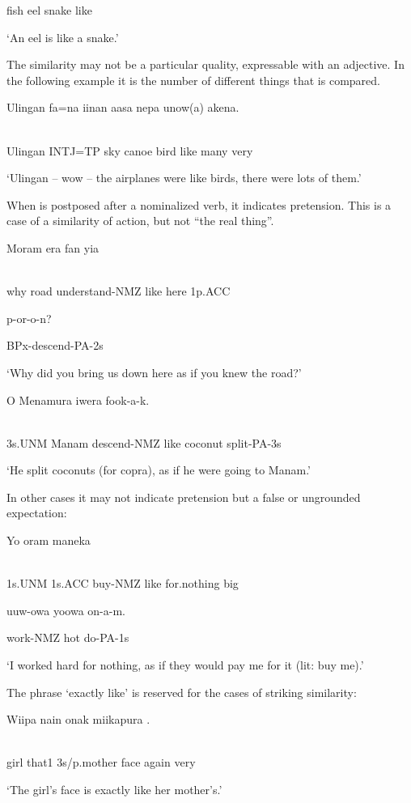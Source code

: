 fish  eel  snake  like

`An eel is like a snake.'

The similarity may not be a particular quality, expressable with an adjective. In the following example it is the number of different things that is compared.

\ea%
\label{ex:x1342}
\gll Ulingan  fa=na  iinan  aasa  nepa    unow(a)  akena. \\
      \\
\glt
\z

Ulingan  INTJ=TP  sky  canoe  bird  like  many  very

`Ulingan -- wow -- the airplanes were like birds, there were lots of them.'

When  is postposed after a nominalized verb, it indicates pretension. This is a case of a similarity of action, but not ``the real thing''.

\ea%
\label{ex:x1343}
\gll Moram  era    fan  yia  \\
      \\
\glt
\z

why  road  understand-NMZ  like  here  1p.ACC

p-or-o-n?

BPx-descend-PA-2s

`Why did you bring us down here as if you knew the road?'

\ea%
\label{ex:x1344}
\gll O  Menamura    iwera  fook-a-k. \\
      \\
\glt
\z

3s.UNM  Manam  descend-NMZ  like  coconut  split-PA-3s

`He split coconuts (for copra), as if he were going to Manam.'

In other cases it may not indicate pretension but a false or ungrounded expectation: 

\ea%
\label{ex:x1345}
\gll Yo    oram  maneka  \\
      \\
\glt
\z

1s.UNM  1s.ACC  buy-NMZ  like  for.nothing  big

uuw-owa  yoowa  on-a-m.

work-NMZ  hot  do-PA-1s

`I worked hard for nothing, as if they would pay me for it (lit: buy me).'

The phrase  `exactly like' is reserved for the cases of striking similarity: 

\ea%
\label{ex:x1346}
\gll Wiipa  nain  onak  miikapura  . \\
      \\
\glt
\z

girl  that1  3s/p.mother  face  again  very

`The girl's face is exactly like her mother's.'

